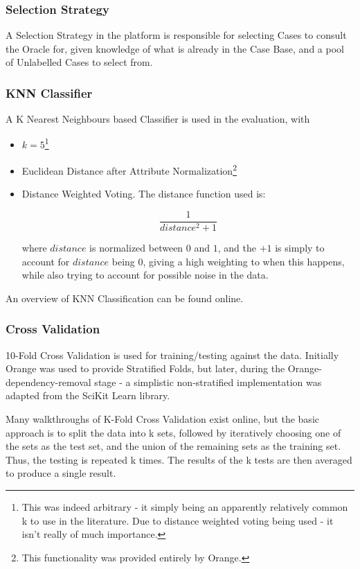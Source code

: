 \documentclass[a4paper,11pt]{report}
\begin{document}
\subsubsection{Selection Strategy}

A Selection Strategy in the platform is responsible for selecting Cases to consult the Oracle for, given knowledge of what is already in the Case Base, and a pool of Unlabelled Cases to select from.

\subsubsection{KNN Classifier}
A K Nearest Neighbours based Classifier is used in the evaluation, with 
\begin{itemize}
	\item $k=5$\footnote{This was indeed arbitrary - it simply being an apparently relatively common k to use in the literature. Due to distance weighted voting being used - it isn't really of much importance.} 
	\item Euclidean Distance after Attribute Normalization\footnote {This functionality was provided entirely by Orange.}
	\item Distance Weighted Voting. The distance function used is:
	
	\[
	\frac{1}{distance^{2}+1}
	\]
	
	where $distance$ is normalized between $0$ and $1$, and the $+1$ is simply to account for $distance$ being $0$, giving a high weighting to when this happens, while also trying to account for possible noise in the data.
	
	
\end{itemize}

An overview of KNN Classification can be found online\citep{web:knntut}.

\subsubsection{Cross Validation}

10-Fold Cross Validation is used for training/testing against the data. Initially Orange was used to provide Stratified Folds, but later, during the Orange-dependency-removal stage - a simplistic non-stratified implementation was adapted from the SciKit Learn library\citep{prog:sklearn}.

Many walkthroughs of K-Fold Cross Validation exist online\citep{web:kfolddemo}, but the basic approach is to split the data into k sets, followed by iteratively choosing one of the sets as the test set, and the union of the remaining sets as the training set. Thus, the testing is repeated k times. The results of the k tests are then averaged to produce a single result.
\end{document}

